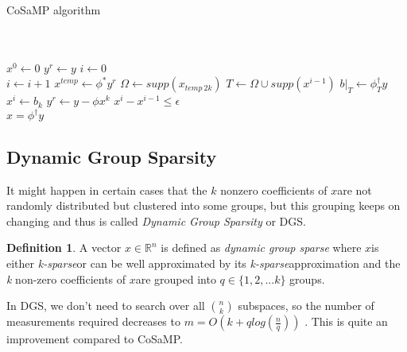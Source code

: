 \documentclass[12pt]{article}
\theoremstyle{definition}
\newtheorem{defn}{Definition}[section]
\def\ksparse{\textit{k-sparse}\hspace{0.1in}}
\def\x{$x$\hspace{0.1in}}
\def\cosamp{CoSaMP\hspace{0.1in}}
\begin{document}
  \begin{algorithm}
   \caption{CoSaMP algorithm}
   \label{CoSaMP}
   \begin{algorithmic}
    \\
    \\
    \State $x^0 \gets 0$
    \State $y^r \gets y$
    \State $i \gets 0$\\
    \Repeat
    \State $i \gets i+1$
    \State $x^{temp} \gets \phi^\ast y^r$
    \State $\Omega \gets supp(x_{temp \ 2k})$
    \State $T \gets \Omega \cup supp(x^{i-1})$
    \State $b|_T \gets \phi_T^\dagger y$
    \State $x^i \gets b_k$
    \State $y^r \gets y - \phi x^k$
    \Until $x^{i} - x^{i-1} \leq \epsilon$ 
    \\
    \Return $x = \phi^\dagger y$
   \end{algorithmic}
\end{algorithm}

\subsection{Dynamic Group Sparsity}
It might happen in certain cases that the $k$ nonzero coefficients of \x are not randomly distributed but clustered
into some groups, but this grouping keeps on changing and thus is called \textit{Dynamic Group Sparsity} or DGS.
\begin{defn}
 A vector $x \in \mathbb{R}^n$ is defined as \textit{dynamic group sparse} where \x is either \ksparse or can be well approximated
 by its \ksparse approximation and the \textit{k} non-zero coefficients of \x are grouped into $q \in \{1,2,...k\}$ groups.
\end{defn}
In DGS, we don't need to search over all $\binom{n}{k}$ subspaces, so the number of measurements required decreases to 
$m=O(k+q log(\frac{n}{q}))$ \cite{Huang-DGS} \cite{Li-CS_in_IoT}.
This is quite an improvement compared to \cosamp.
\end{document}
